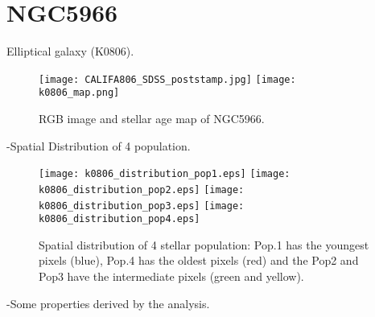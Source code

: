 \newpage
\section*{NGC5966}
Elliptical galaxy (K0806).

\begin{figure}[bh]
\begin{center}
\texttt{[image: CALIFA806\_SDSS\_poststamp.jpg]}
\texttt{[image: k0806\_map.png]}
\caption{RGB image and stellar age map of NGC5966.}
   \label{fig1}
\end{center}
\end{figure}

-Spatial Distribution of 4 population.

\begin{figure}[bh]
\begin{center}
\texttt{[image: k0806\_distribution\_pop1.eps]}
\texttt{[image: k0806\_distribution\_pop2.eps]}
\texttt{[image: k0806\_distribution\_pop3.eps]}
\texttt{[image: k0806\_distribution\_pop4.eps]}
 \caption{Spatial distribution of 4 stellar population: Pop.1 has the youngest pixels (blue), Pop.4 has the oldest pixels (red) and the Pop2 and Pop3 have the intermediate pixels (green and yellow).}
   \label{fig1}
\end{center}
\end{figure}


-Some properties derived by the analysis.


